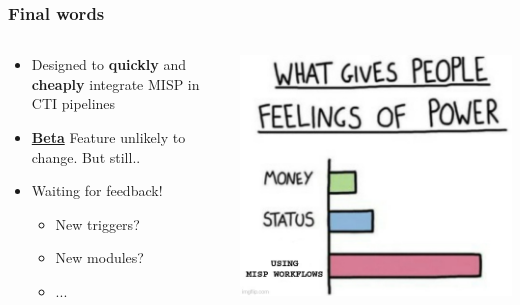 \begin{frame}
    \frametitle{Final words}
    \begin{columns}
        \begin{column}{0.6\textwidth}
            \begin{itemize}
                \item Designed to \textbf{quickly} and \textbf{cheaply} integrate MISP in CTI pipelines
                \item \underline{\textbf{Beta}} Feature unlikely to change. But still..
                \item Waiting for feedback!
                \begin{itemize}
                    \item New triggers?
                    \item New modules?
                    \item ...
                \end{itemize}
            \end{itemize}
        \end{column}
        \begin{column}{0.4\textwidth}
            \includegraphics[width=1.0\linewidth]{pictures/feeling-of-power.jpg}
        \end{column}
    \end{columns}
    \vspace*{0.5em}
\end{frame}

